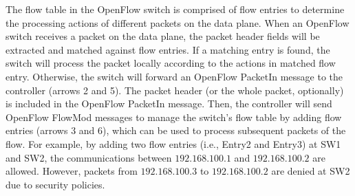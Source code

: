 The flow table in the OpenFlow switch is comprised of flow entries to determine the processing actions of different packets on the data plane. When an OpenFlow switch receives a packet on the data plane, the packet header fields will be extracted and matched against flow entries. If a matching entry is found, the switch will process the packet locally according to the actions in matched flow entry. Otherwise, the switch will forward an OpenFlow PacketIn message to the controller (arrows 2 and 5). The packet header (or the whole packet, optionally) is included in the OpenFlow PacketIn message. Then, the controller will send OpenFlow FlowMod messages to manage the switch’s flow table by adding flow entries (arrows 3 and 6), which can be used to process subsequent packets of the flow.  For example, by adding two flow entries (i.e., Entry2 and Entry3) at SW1 and SW2, the communications between $192.168.100.1$ and $192.168.100.2$ are allowed.
However, packets from $192.168.100.3$ to $192.168.100.2$ are denied at SW2 due to security policies.
